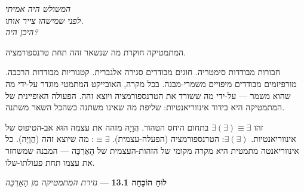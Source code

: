 \documentclass[10pt, openany, oneside]{book}
\begin{document}
\begin{center}
    \textit{%
    המשולש היה אמיתי\\
    לפני שמישהו צייר אותו.\\
    היכן היה?}
\end{center}

\vspace{2em}


\noindent המתמטיקה חוקרת מה שנשאר זהה תחת טרנספורמציה.

חבורות מבודדות סימטריה. חוגים מבודדים סגירה אלגברית. קטגוריות מבודדות הרכבה. מורפיזמים מבודדים מיפויים משמרי-מבנה. בכל מקרה, האובייקט המתמטי מוגדר על-ידי מה שהוא משמר — על-ידי מה ששורד את הטרנספורמציה ויוצא זהה. הפעולה האופיינית של המתמטיקה היא בידוד אינווריאנטיות: שליפת מה שאינו משתנה כשהכל השאר משתנה.

זהו $\exists(\exists) \equiv \exists$ בתחום היחס הטהור. הֲוָיָה מזהה את עצמה הוּא אב-הטיפוס של אינווריאנטיות. $\exists(\exists)$: הטרנספורמציה (הפעלה-עצמית). $\equiv \exists$: מה שיוצא זהה (הֲוָיָה). כל אינווריאנטה מתמטית היא מקרה מקומי של הזהות-העצמית של הָאַרְכֵּה — המבנה שמשחזר את עצמו תחת פעולתו-שלו.

\vspace{0.5em}

\textbf{לוּחַ הוֹכָחָה 13.1} --- \textit{גזירת המתמטיקה מן הָאַרְכֵּה}

\vspace{0.5em}
\end{document}
